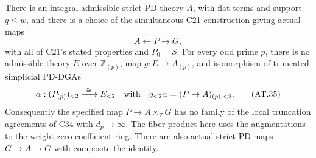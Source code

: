 \begin{theorem}
\label{AT12}
There is an integral admissible strict PD theory $A$, with
flat terms and support $q\leq w$, and there is a choice of
the simultaneous C21 construction giving actual maps
\[
                 A\longleftarrow P\longrightarrow G,
 \tag{AT.34}
\]
with all of C21's stated properties and $P_0=S$.
For every odd prime $p$, there is no admissible theory $E$
over $\mathbb Z_{(p)}$, map $g:E\to A_{(p)}$, and
isomorphism of truncated simplicial PD-DGAs
\[
 \alpha:(P_{(p)})_{<2}\xrightarrow{\ \cong\ }E_{<2}
 \quad\hbox{with}\quad
 g_{<2}\alpha=(P\to A)_{(p),<2}.
 \tag{AT.35}
\]
Consequently the specified map
$P\to A\times_{\mathbb Z}G$ has no family of the local
truncation agreements of C34 with $d_p\to\infty$.
The fiber product here uses the augmentations to the
weight-zero coefficient ring.  There are also actual
strict PD maps $G\to A\to G$ with composite the identity.
\end{theorem}

